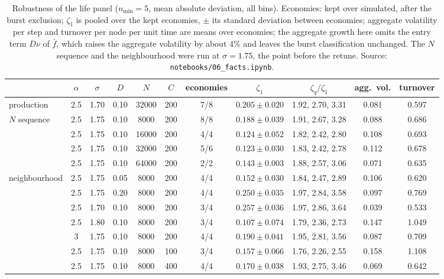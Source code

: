\documentclass[pre,twocolumn,superscriptaddress,nofootinbib]{revtex4-2}
\begin{document}
\begin{table}[t]
\caption{Robustness of the life panel ($n_{\min}=5$, mean absolute deviation, all bins).  Economies: kept
over simulated, after the burst exclusion; $\zeta_1$ is pooled over the kept economies, $\pm$ its standard
deviation between economies; aggregate volatility per step and turnover per node per unit time are
means over economies; the aggregate growth here omits the entry term $D\nu$ of $\bar f$, which raises the aggregate
volatility by about $4\%$ and leaves the burst classification unchanged.  The $N$ sequence and the neighbourhood were run at $\sigma=1.75$, the point
before the retune.  Source: \texttt{notebooks/06\_facts.ipynb}.}
\label{tab:robust}
\begin{ruledtabular}
\begin{tabular}{lcccccccccc}
 & $\alpha$ & $\sigma$ & $D$ & $N$ & $C$ & economies & $\zeta_1$ & $\zeta_q/\zeta_1$ & agg.\ vol. & turnover\\
\hline
production & 2.5 & 1.70 & 0.10 & 32000 & 200 & 7/8 & $0.205\pm0.020$ & 1.92, 2.70, 3.31 & 0.081 & 0.597\\
\hline
$N$ sequence & 2.5 & 1.75 & 0.10 & 8000 & 200 & 8/8 & $0.188\pm0.039$ & 1.91, 2.67, 3.28 & 0.088 & 0.686\\
 & 2.5 & 1.75 & 0.10 & 16000 & 200 & 4/4 & $0.124\pm0.052$ & 1.82, 2.42, 2.80 & 0.108 & 0.693\\
 & 2.5 & 1.75 & 0.10 & 32000 & 200 & 5/6 & $0.123\pm0.030$ & 1.83, 2.42, 2.78 & 0.112 & 0.678\\
 & 2.5 & 1.75 & 0.10 & 64000 & 200 & 2/2 & $0.143\pm0.003$ & 1.88, 2.57, 3.06 & 0.071 & 0.635\\
\hline
neighbourhood & 2.5 & 1.75 & 0.05 & 8000 & 200 & 4/4 & $0.152\pm0.030$ & 1.84, 2.47, 2.89 & 0.106 & 0.620\\
 & 2.5 & 1.75 & 0.20 & 8000 & 200 & 4/4 & $0.250\pm0.035$ & 1.97, 2.84, 3.58 & 0.097 & 0.769\\
 & 2.5 & 1.70 & 0.10 & 8000 & 200 & 3/4 & $0.257\pm0.036$ & 1.97, 2.86, 3.64 & 0.039 & 0.533\\
 & 2.5 & 1.80 & 0.10 & 8000 & 200 & 3/4 & $0.107\pm0.074$ & 1.79, 2.36, 2.73 & 0.147 & 1.049\\
 & 3 & 1.75 & 0.10 & 8000 & 200 & 4/4 & $0.190\pm0.041$ & 1.95, 2.81, 3.56 & 0.087 & 0.709\\
 & 2.5 & 1.75 & 0.10 & 8000 & 100 & 3/4 & $0.157\pm0.066$ & 1.76, 2.26, 2.55 & 0.158 & 1.108\\
 & 2.5 & 1.75 & 0.10 & 8000 & 400 & 4/4 & $0.170\pm0.038$ & 1.93, 2.75, 3.46 & 0.069 & 0.642\\

\end{tabular}
\end{ruledtabular}
\end{table}
\end{document}
